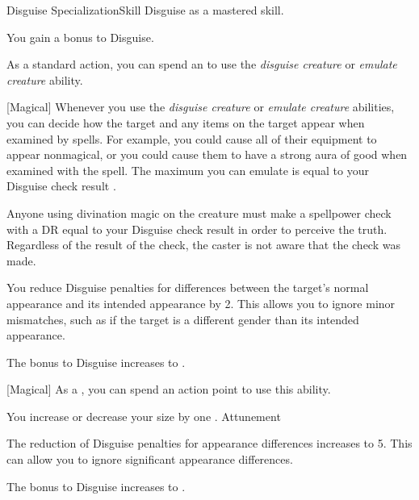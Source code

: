     \begin{feat}{Disguise Specialization}{Skill}
        \featpre Disguise as a mastered skill.
        \featben

         You gain a  bonus to Disguise.

         As a standard action, you can spend an  to use the \textit{disguise creature} or \textit{emulate creature} ability.

        [Magical] Whenever you use the \textit{disguise creature} or \textit{emulate creature} abilities, you can decide how the target and any items on the target appear when examined by  spells.
        For example, you could cause all of their equipment to appear nonmagical, or you could cause them to have a strong aura of good when examined with the  spell.
        The maximum  you can emulate is equal to your Disguise check result .

        Anyone using divination magic on the creature must make a spellpower check with a DR equal to your Disguise check result in order to perceive the truth.
        Regardless of the result of the check, the caster is not aware that the check was made.

         You reduce Disguise penalties for differences between the target's normal appearance and its intended appearance by 2.
        This allows you to ignore minor mismatches, such as if the target is a different gender than its intended appearance.

         The bonus to Disguise increases to .

        [Magical] As a , you can spend an action point to use this ability.
        \begin{ability}
            \begin{spelltargetinginfo}
            \end{spelltargetinginfo}
            \begin{spelleffects}
                \spelleffect You increase or decrease your size by one .
                \spelldur Attunement
            \end{spelleffects}
        \end{ability}

         The reduction of Disguise penalties for appearance differences increases to 5.
        This can allow you to ignore significant appearance differences.

         The bonus to Disguise increases to .
    \end{feat}

